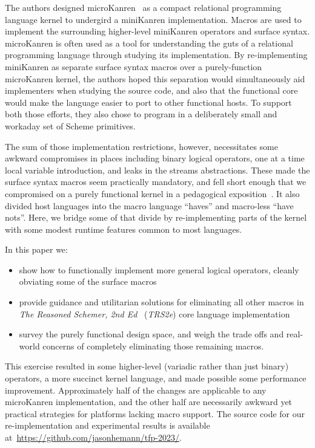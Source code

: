 \documentclass[sigplan,draft,balance,pbalance,natbib=false]{acmart}
\begin{document}
The authors designed microKanren~\cite{hemann2013muKanren} as a
compact relational programming language kernel to undergird a
miniKanren implementation. Macros are used to implement the
surrounding higher-level miniKanren operators and surface syntax.\@
microKanren is often used as a tool for understanding the guts of a
relational programming language through studying its implementation.
By re-implementing miniKanren as separate surface syntax macros over a
purely-function microKanren kernel, the authors hoped this separation
would simultaneously aid implementers when studying the source code,
and also that the functional core would make the language easier to
port to other functional hosts. To support both those efforts, they
also chose to program in a deliberately small and workaday set of
Scheme primitives.

The sum of those implementation restrictions, however, necessitates
some awkward compromises in places including binary logical operators,
one at a time local variable introduction, and leaks in the streams
abstractions. These made the surface syntax macros seem practically
mandatory, and fell short enough that we compromised on a purely
functional kernel in a pedagogical
exposition~\cite{friedman2018reasoned}. It also divided host languages
into the macro language \enquote{haves} and macro-less \enquote{have
  nots}. Here, we bridge some of that divide by re-implementing parts
of the kernel with some modest runtime features common to most
languages.

In this paper we:
%
\begin{itemize}

\item show how to functionally implement more general logical
  operators, cleanly obviating some of the surface macros

\item provide guidance and utilitarian solutions for eliminating all
  other macros in \emph{The Reasoned Schemer, 2nd
    Ed}~\cite{friedman2018reasoned} (\emph{TRS2e}) core language
  implementation

\item survey the purely functional design space, and weigh the trade
  offs and real-world concerns of completely eliminating those
  remaining macros.

\end{itemize}

This exercise resulted in some higher-level (variadic rather than just
binary) operators, a more succinct kernel language, and made possible
some performance improvement. Approximately half of the changes are
applicable to any microKanren implementation, and the other half are
necessarily awkward yet practical strategies for platforms lacking
macro support. The source code for our re-implementation and
experimental results is available
at~\url{https://github.com/jasonhemann/tfp-2023/}.
\end{document}
